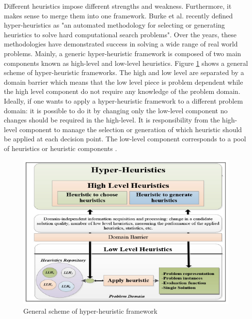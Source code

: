 \documentclass[conference]{IEEEtran}
\begin{document}

 Different heuristics impose different strengths and weakness. Furthermore, it makes sense to merge them into one framework. Burke et al. \cite{burke2010classification} recently defined hyper-heuristics as "an automated methodology for selecting or generating heuristics to solve hard computational search problems". Over the years, these methodologies have demonstrated success in solving a wide range of real world problems. Mainly, a generic hyper-heuristic framework is composed of two main components known as high-level and low-level heuristics. Figure \ref{fig:HyperHeuristics} shows a general scheme of hyper-heuristic frameworks. The high and low level are separated by a domain barrier which means that the low level piece is problem dependent while the high level component do not require any knowledge of the problem domain. Ideally, if one wants to apply a hyper-heuristic framework to a different problem domain: it is possible to do it by changing only the low-level component no changes should be required in the high-level. It is responsibility from the high-level component to manage the selection or generation of which heuristic should be applied at each decision point. The low-level component corresponds to a pool of heuristics or heuristic components \cite{sabar2015automatic}. 


\begin{figure}[htb!] \label{fig:HyperHeuristics}
	\centering
	\includegraphics[scale=0.6]{figures/hyperheuristic.png}
	\caption{General scheme of hyper-heuristic framework}
\end{figure}	
\end{document}

